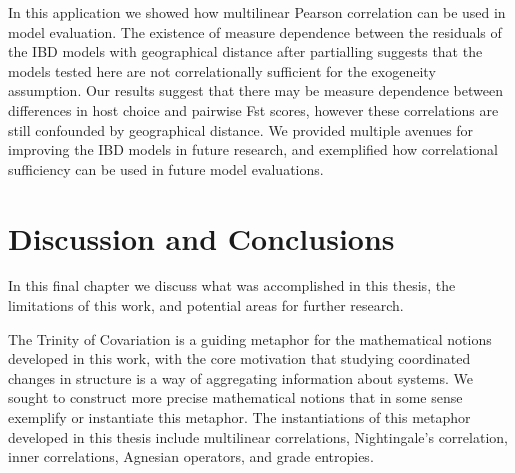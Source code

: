 \documentclass[
  letterpaper,
  DIV=11,
  numbers=noendperiod]{scrreprt}
\begin{document}
In this application we showed how multilinear Pearson correlation can be
used in model evaluation. The existence of measure dependence between
the residuals of the IBD models with geographical distance after
partialling suggests that the models tested here are not correlationally
sufficient for the exogeneity assumption. Our results suggest that there
may be measure dependence between differences in host choice and
pairwise Fst scores, however these correlations are still confounded by
geographical distance. We provided multiple avenues for improving the
IBD models in future research, and exemplified how correlational
sufficiency can be used in future model evaluations.


\chapter{Discussion and Conclusions}\label{discussion-and-conclusions}

In this final chapter we discuss what was accomplished in this thesis,
the limitations of this work, and potential areas for further research.

The Trinity of Covariation is a guiding metaphor for the mathematical
notions developed in this work, with the core motivation that studying
coordinated changes in structure is a way of aggregating information
about systems. We sought to construct more precise mathematical notions
that in some sense exemplify or instantiate this metaphor. The
instantiations of this metaphor developed in this thesis include
multilinear correlations, Nightingale's correlation, inner correlations,
Agnesian operators, and grade entropies.
\end{document}
